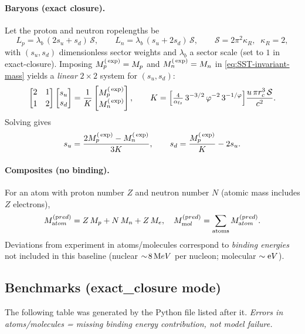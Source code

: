 \documentclass[10pt,reprint,aps,onecolumn,nofootinbib]{revtex4-2}
\begin{document}
\paragraph{Baryons (exact closure).}
    Let the proton and neutron ropelengths be
    \[
        L_p=\lambda_b\,(2s_u+s_d)\,\mathcal S,\qquad
        L_n=\lambda_b\,(s_u+2s_d)\,\mathcal S,\qquad
        \mathcal S=2\pi^2\kappa_R,\;\;\kappa_R=2,
    \]
    with $(s_u,s_d)$ dimensionless sector weights and $\lambda_b$ a sector scale (set to $1$ in exact-closure).
    Imposing $M_p^{\textrm(\exp)}=M_p$ and $M_n^{\textrm(\exp)}=M_n$ in \eqref{eq:SST-invariant-mass} yields a \emph{linear} $2\times2$ system for $(s_u,s_d)$:
    \[
        \begin{bmatrix}
            2 & 1\\[2pt]
            1 & 2
        \end{bmatrix}
        \begin{bmatrix}
            s_u\\ s_d
        \end{bmatrix}

        =
        \frac{1}{K}
        \begin{bmatrix}
            M_p^{\textrm(\exp)}\\ M_n^{\textrm(\exp)}
        \end{bmatrix},
        \qquad
        K=\Big[\tfrac{4}{\alpha_{\textrm fs}}\,3^{-3/2}\,\varphi^{-2}\,3^{-1/\varphi}\Big]\frac{u\,\pi r_c^3\,\mathcal S}{c^2}.
    \]
    Solving gives
    \[
        s_u=\frac{2M_p^{\textrm(\exp)}-M_n^{\textrm(\exp)}}{3K},
        \qquad
        s_d=\frac{M_p^{\textrm(\exp)}}{K}-2s_u.
    \]

\paragraph{Composites (no binding).}
    For an atom with proton number $Z$ and neutron number $N$ (atomic mass includes $Z$ electrons),
    \[
        M_{\textrm atom}^{(\textrm pred)} = Z\,M_p+N\,M_n+Z\,M_e,\quad
        M_{\textrm mol}^{(\textrm pred)}=\sum_{\text{atoms}}M_{\textrm atom}^{(\textrm pred)}.
    \]
    Deviations from experiment in atoms/molecules correspond to \emph{binding energies} not included in this baseline (nuclear $\sim\!8\,{\textrm MeV}$ per nucleon; molecular $\sim{\textrm eV}$).

\subsection{Benchmarks (exact\_closure mode)}
\label{sec:benchmarks-exact-closure}
The following table was generated by the Python file listed after it.
\emph{Errors in atoms/molecules = missing binding energy contribution, not model failure.}
\end{document}

